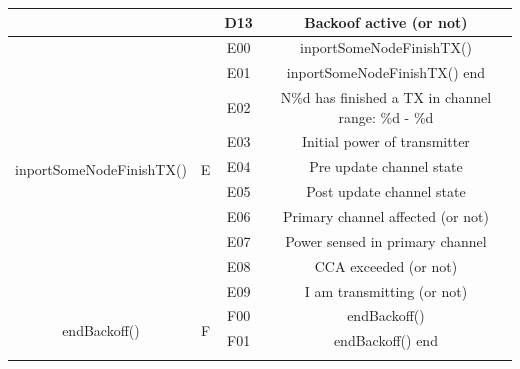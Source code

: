 \documentclass[a4paper]{article}
\begin{document}
\begin{table}[]
\begin{tabular}{|c|c|c|c|}
		                                           &                     & D13               & Backoof active (or not)                                 \\ \hline
		\multirow{10}{*}{inportSomeNodeFinishTX()} & \multirow{10}{*}{E} & E00               & inportSomeNodeFinishTX()                                \\ \cline{3-4} 
		                                           &                     & E01               & inportSomeNodeFinishTX() end                            \\ \cline{3-4} 
		                                           &                     & E02               & N\%d has finished a TX in channel range: \%d - \%d      \\ \cline{3-4} 
		                                           &                     & E03               & Initial power of transmitter                            \\ \cline{3-4} 
		                                           &                     & E04               & Pre update channel state                                \\ \cline{3-4} 
		                                           &                     & E05               & Post update channel state                               \\ \cline{3-4} 
		                                           &                     & E06               & Primary channel affected (or not)                       \\ \cline{3-4} 
		                                           &                     & E07               & Power sensed in primary channel                         \\ \cline{3-4} 
		                                           &                     & E08               & CCA exceeded (or not)                                   \\ \cline{3-4} 
		                                           &                     & E09               & I am transmitting (or not)                              \\ \hline
		\multirow{6}{*}{endBackoff()}              & \multirow{6}{*}{F}  & F00               & endBackoff()                                            \\ \cline{3-4} 
		                                           &                     & F01               & endBackoff() end                                        \\ \cline{3-4} 

\end{tabular}
\end{table}
\end{document}
